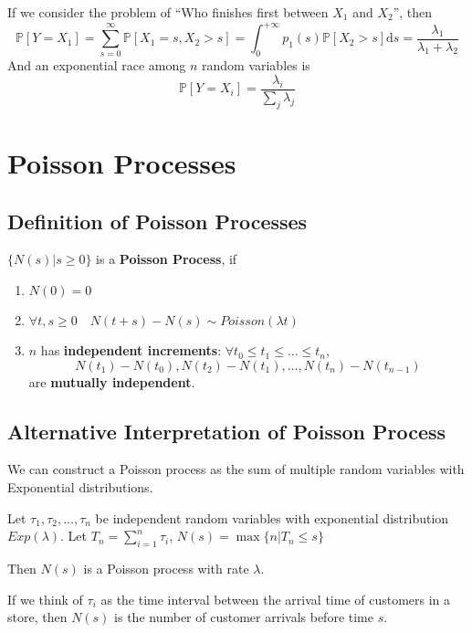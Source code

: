         If we consider the problem of ``Who finishes first between $X_1$ and $X_2$'', then
        \[ \mathbb{P}[Y=X_1]=\sum_{s=0}^\infty \mathbb{P}[X_1=s,X_2>s] = \int_0^{+\infty}p_1(s)\mathbb{P}[X_2>s]\mathrm{d}s = \frac{\lambda_1}{\lambda_1 + \lambda_2} \]
        And an exponential race among $n$ random variables is
        \[ \mathbb{P}[Y=X_i] = \frac{\lambda_i}{\sum_j \lambda_j} \]


\section{Poisson Processes}

    \subsection{Definition of Poisson Processes}
    \begin{definition}\label{def:PoissonProcess}
        $\{N(s)|s \ge 0\}$ is a \textbf{Poisson Process}, if
        \begin{enumerate}
            \item $N(0)=0$
            \item $\forall t, s \ge 0 \quad N(t+s) - N(s) \sim Poisson(\lambda t)$
            \item $n$ has \textbf{independent increments}: $\forall t_0 \le t_1 \le \dots \le t_n$,
            \[ N(t_1)-N(t_0), N(t_2)-N(t_1), \dots, N(t_n)-N(t_{n-1}) \]
            are \textbf{mutually independent}.
        \end{enumerate}
    \end{definition}

    \subsection{Alternative Interpretation of Poisson Process}
    We can construct a Poisson process as the sum of multiple random variables with Exponential distributions.
    \begin{proposition}\label{prop:AltdefOfPoissonProcess}
        Let $\tau_1,\tau_2,\dots,\tau_n$ be independent random variables with exponential distribution $Exp(\lambda)$. Let $T_n=\sum_{i=1}^n\tau_i$, $N(s)=\max\{n|T_n \le s\}$

        Then $N(s)$ is a Poisson process with rate $\lambda$.
    \end{proposition}
    \begin{remark}
        If we think of $\tau_i$ as the time interval between the arrival time of customers in a store, then $N(s)$ is the number of customer arrivals before time $s$.
    \end{remark}

